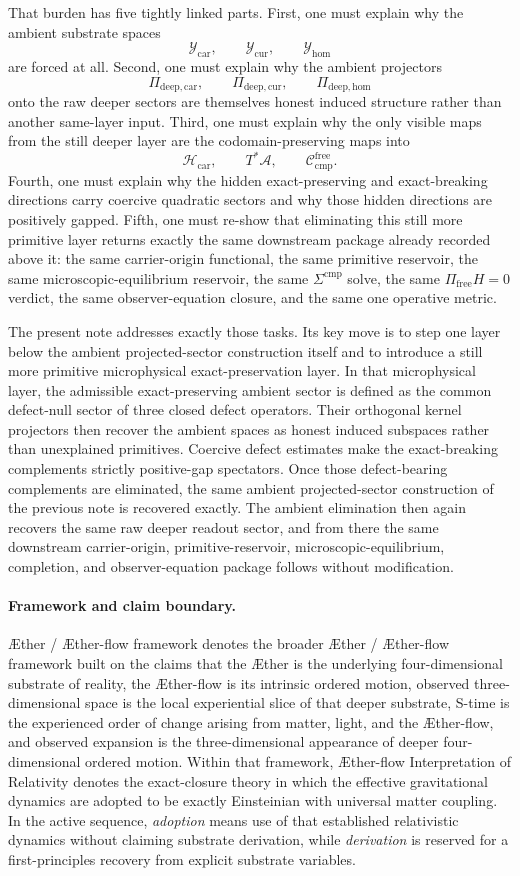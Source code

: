 \documentclass[11pt]{article}
\newcommand{\Aether}{\AE{}ther}
\newcommand{\Aflow}{\AE{}ther-flow}
\newcommand{\TheoryName}{\Aflow{} Interpretation of Relativity}
\newcommand{\TheoryProgram}{\Aether{} / \Aflow{} framework}
\newcommand{\Sub}{\mathcal A}
\newcommand{\CompFree}{\mathscr C_{\mathrm{cmp}}^{\mathrm{free}}}
\newcommand{\CarrierClass}{\mathscr H_{\mathrm{car}}}
\newcommand{\ProtoTensorClass}{\mathscr Y_{\mathrm{car}}}
\newcommand{\ProtoRelabelClass}{\mathscr Y_{\mathrm{cur}}}
\newcommand{\ProtoFreeClass}{\mathscr Y_{\mathrm{hom}}}
\newcommand{\ProtoCarProj}{\Pi_{\mathrm{deep,car}}}
\newcommand{\ProtoCurProj}{\Pi_{\mathrm{deep,cur}}}
\newcommand{\ProtoHomProj}{\Pi_{\mathrm{deep,hom}}}
\begin{document}
That burden has five tightly linked parts. First, one must explain why the ambient substrate spaces
\[
\ProtoTensorClass,\qquad
\ProtoRelabelClass,\qquad
\ProtoFreeClass
\]
are forced at all. Second, one must explain why the ambient projectors
\[
\ProtoCarProj,\qquad
\ProtoCurProj,\qquad
\ProtoHomProj
\]
onto the raw deeper sectors are themselves honest induced structure rather than another same-layer input. Third, one must explain why the only visible maps from the still deeper layer are the codomain-preserving maps into
\[
\CarrierClass,\qquad
T^*\Sub,\qquad
\CompFree.
\]
Fourth, one must explain why the hidden exact-preserving and exact-breaking directions carry coercive quadratic sectors and why those hidden directions are positively gapped. Fifth, one must re-show that eliminating this still more primitive layer returns exactly the same downstream package already recorded above it: the same carrier-origin functional, the same primitive reservoir, the same microscopic-equilibrium reservoir, the same \(\Sigma^{\mathrm{cmp}}\) solve, the same \(\Pi_{\mathrm{free}}H=0\) verdict, the same observer-equation closure, and the same one operative metric.

The present note addresses exactly those tasks. Its key move is to step one layer below the ambient projected-sector construction itself and to introduce a still more primitive microphysical exact-preservation layer. In that microphysical layer, the admissible exact-preserving ambient sector is defined as the common defect-null sector of three closed defect operators. Their orthogonal kernel projectors then recover the ambient spaces as honest induced subspaces rather than unexplained primitives. Coercive defect estimates make the exact-breaking complements strictly positive-gap spectators. Once those defect-bearing complements are eliminated, the same ambient projected-sector construction of the previous note is recovered exactly. The ambient elimination then again recovers the same raw deeper readout sector, and from there the same downstream carrier-origin, primitive-reservoir, microscopic-equilibrium, completion, and observer-equation package follows without modification.

\paragraph{Framework and claim boundary.}
\TheoryProgram{} denotes the broader \Aether{} / \Aflow{} framework built on the claims that the \Aether{} is the underlying four-dimensional substrate of reality, the \Aflow{} is its intrinsic ordered motion, observed three-dimensional space is the local experiential slice of that deeper substrate, S-time is the experienced order of change arising from matter, light, and the \Aflow{}, and observed expansion is the three-dimensional appearance of deeper four-dimensional ordered motion. Within that framework, \TheoryName{} denotes the exact-closure theory in which the effective gravitational dynamics are adopted to be exactly Einsteinian with universal matter coupling. In the active sequence, \emph{adoption} means use of that established relativistic dynamics without claiming substrate derivation, while \emph{derivation} is reserved for a first-principles recovery from explicit substrate variables.
\end{document}
